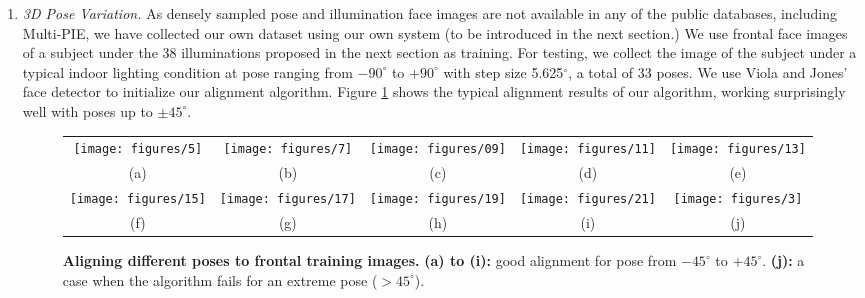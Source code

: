 \documentclass[10pt,twocolumn,letterpaper]{article}
\begin{document}
\begin{enumerate}
\vspace{-2mm}
\item{\em 3D Pose Variation.} As densely sampled pose and illumination face images are not available in any of the public databases, including Multi-PIE, we have collected our own dataset using our own system (to be introduced in the next section.) We use frontal face images of a subject under the 38 illuminations proposed in the next section as training. For testing, we collect the image of the subject under a typical indoor lighting condition at pose ranging from $-90^\circ$ to $+90^\circ$ with step size 5.625$^\circ$, a total of 33 poses. We use Viola and Jones' face detector to initialize our alignment algorithm. 
Figure \ref{fig:pose-alignment} shows the typical alignment results of our algorithm, working surprisingly well with poses up to $\pm 45^\circ$. \vspace{-4mm}
\begin{figure}[t]
\begin{tabular}{ccccc}
\texttt{[image: figures/5]} &
\texttt{[image: figures/7]} &
\texttt{[image: figures/09]} &
\texttt{[image: figures/11]} &
\texttt{[image: figures/13]} \\
(a) & (b) & (c) & (d) & (e)\\
\texttt{[image: figures/15]} &
\texttt{[image: figures/17]} &
\texttt{[image: figures/19]} &
\texttt{[image: figures/21]} &
\texttt{[image: figures/3]} \\
(f) & (g) & (h) & (i) & (j)
\end{tabular}
\caption{{\bf Aligning different poses to frontal training images.} {\bf (a) to (i):}  good alignment for pose from $-45^{\circ}$
to $+45^{\circ}$. {\bf (j):} a case when the algorithm fails for an extreme pose ($>45^{\circ}$).\vspace{-4mm}
}\label{fig:pose-alignment}
\end{figure}
\end{enumerate}
\end{document}
